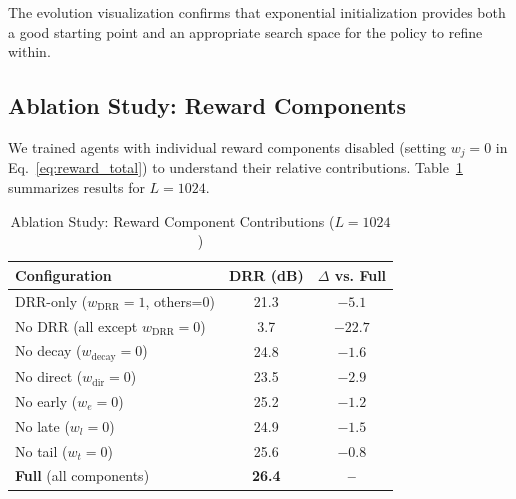 \documentclass[12pt,a4paper]{article}
\begin{document}
The evolution visualization confirms that exponential initialization provides both a good starting point and an appropriate search space for the policy to refine within.

\subsection{Ablation Study: Reward Components}

We trained agents with individual reward components disabled (setting $w_j=0$ in Eq.~\eqref{eq:reward_total}) to understand their relative contributions. Table~\ref{tab:ablation} summarizes results for $L=1024$.

\begin{table}[t]
\centering
\caption{Ablation Study: Reward Component Contributions ($L=1024$)}
\label{tab:ablation}
\small
\begin{tabular}{@{}lcc@{}}
\toprule
\textbf{Configuration} & \textbf{DRR (dB)} & \textbf{$\Delta$ vs. Full} \\
\midrule
DRR-only ($w_{\text{DRR}}=1$, others=0) & 21.3 & $-5.1$ \\
No DRR (all except $w_{\text{DRR}}=0$) & 3.7 & $-22.7$ \\
No decay ($w_{\text{decay}}=0$) & 24.8 & $-1.6$ \\
No direct ($w_{\text{dir}}=0$) & 23.5 & $-2.9$ \\
No early ($w_e=0$) & 25.2 & $-1.2$ \\
No late ($w_l=0$) & 24.9 & $-1.5$ \\
No tail ($w_t=0$) & 25.6 & $-0.8$ \\
\midrule
\textbf{Full} (all components) & \textbf{26.4} & \textbf{--} \\
\bottomrule
\end{tabular}
\end{table}
\end{document}
